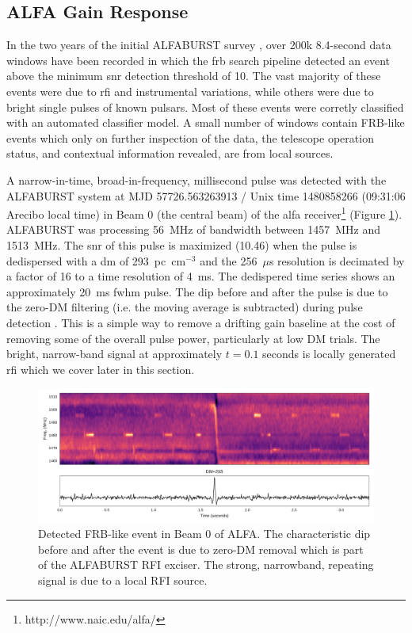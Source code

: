 \documentclass[a4paper,fleqn,usenatbib]{mnras}
\begin{document}
\subsection{ALFA Gain Response}
\label{sec:D20161204}

In the two years of the initial ALFABURST survey \citep{2017ApJS..228...21C,
2018MNRAS.474.3847F}, over 200k 8.4-second data windows have been recorded in
which the \gls{frb} search pipeline detected an event above the minimum
\gls{snr} detection threshold of 10.  The vast
majority of these events were due to \gls{rfi} and instrumental variations,
while others were due to bright single pulses of known pulsars. Most of these
events were corretly classified with an automated classifier model. A small number of
windows contain FRB-like events which only on further inspection of the data,
the telescope operation status, and contextual information revealed, are from
local sources.

A narrow-in-time, broad-in-frequency, millisecond pulse was detected with the
ALFABURST system at MJD 57726.563263913 / Unix time 1480858266 (09:31:06 Arecibo
local time) in Beam 0 (the central beam) of the \gls{alfa}
receiver\footnote{http://www.naic.edu/alfa/} (Figure
\ref{fig:beam0_dynamic_spec_wide}). ALFABURST was processing 56~MHz of bandwidth
between 1457~MHz and 1513~MHz. The \gls{snr} of this pulse is maximized (10.46)
when the pulse is dedispersed with a \gls{dm} of 293~pc~cm$^{-3}$ and the
256~$\mu$s resolution is decimated by a factor of 16 to a time resolution of
4~ms. The dedispered time series shows an approximately 20~ms \gls{fwhm} pulse.
The dip before and after the pulse is due to the zero-DM filtering (i.e. the
moving average is subtracted) during pulse detection
\citep{2009MNRAS.395..410E}. This is a simple way to remove a drifting gain
baseline at the cost of removing some of the overall pulse power, particularly
at low DM trials. The bright, narrow-band signal at approximately $t=0.1$
seconds is locally generated \gls{rfi} which we cover later in this section.

\begin{figure}
    \includegraphics[width=1.0\linewidth]{figures/D20161204_buf23_Beam0_wide.pdf}
    \caption{Detected FRB-like event in Beam 0 of ALFA. The characteristic dip
    before and after the event is due to zero-DM removal which is part of the
    ALFABURST RFI exciser. The strong, narrowband, repeating signal is due to a
    local RFI source.
    }
    \label{fig:beam0_dynamic_spec_wide}
\end{figure}
\end{document}
